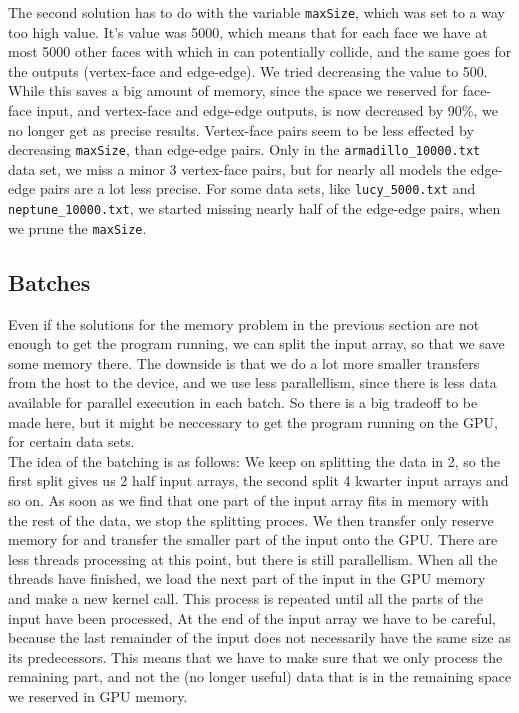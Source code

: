 The second solution has to do with the variable \texttt{maxSize}, which was set to a way too high value. It's value was 5000, which means that for each face we have at most 5000 other faces with which in can potentially collide, and the same goes for the outputs (vertex-face and edge-edge). We tried decreasing the value to 500. While this saves a big amount of memory, since the space we reserved for face-face input, and vertex-face and edge-edge outputs, is now decreased by 90\%, we no longer get as precise results. Vertex-face pairs seem to be less effected by decreasing \texttt{maxSize}, than edge-edge pairs. Only in the \texttt{armadillo\_10000.txt} data set, we miss a minor 3 vertex-face pairs, but for nearly all models the edge-edge pairs are a lot less precise. For some data sets, like \texttt{lucy\_5000.txt} and \texttt{neptune\_10000.txt}, we started missing nearly half of the edge-edge pairs, when we prune the \texttt{maxSize}.

\subsection{Batches}
Even if the solutions for the memory problem in the previous section are not enough to get the program running, we can split the input array, so that we save some memory there. The downside is that we do a lot more smaller transfers from the host to the device, and we use less parallellism, since there is less data available for parallel execution in each batch. So there is a big tradeoff to be made here, but it might be neccessary to get the program running on the GPU, for certain data sets.\\

The idea of the batching is as follows: We keep on splitting the data in 2, so the first split gives us 2 half input arrays, the second split 4 kwarter input arrays and so on. As soon as we find that one part of the input array fits in memory with the rest of the data, we stop the splitting proces. We then transfer only reserve memory for and transfer the smaller part of the input onto the GPU. There are less threads processing at this point, but there is still parallellism. When all the threads have finished, we load the next part of the input in the GPU memory and make a new kernel call. This process is repeated until all the parts of the input have been processed, At the end of the input array we have to be careful, because the last remainder of the input does not necessarily have the same size as its predecessors. This means that we have to make sure that we only process the remaining part, and not the (no longer useful) data that is in the remaining space we reserved in GPU memory.

